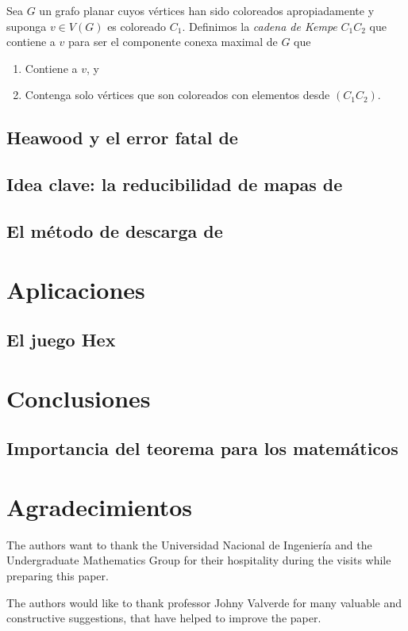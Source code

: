 \documentclass[3p,times,a4paper,twocolumn,authoryear]{elsarticle} %
\begin{document}
\begin{definition}
Sea $G$ un grafo planar cuyos vértices han sido coloreados apropiadamente y suponga $v\in V(G)$ es coloreado $C_1$. Definimos la \emph{cadena de Kempe} $C_1C_2$ que contiene a $v$ para ser el componente conexa maximal de $G$ que

\begin{enumerate}%
	\item Contiene a $v$, y
	\item Contenga solo vértices que son coloreados con elementos desde $(C_1C_2)$.
	\end{enumerate}
\end{definition}

\subsection{Heawood y el error fatal de \citeauthor{kempe}}

\subsection{Idea clave: la reducibilidad de mapas de \citeauthor{birkhoff}}

\subsection{El método de descarga de \citeauthor{appel}}

\section{Aplicaciones}

\subsection{El juego Hex}

\section{Conclusiones}

\subsection{Importancia del teorema para los matemáticos}

\section*{Agradecimientos}

The authors want to thank the Universidad Nacional de Ingeniería and the Undergraduate Mathematics Group for their hospitality during the visits while preparing this paper.

The authors would like to thank professor Johny Valverde for many valuable and constructive suggestions, that have helped to improve the paper.

\nocite{*}
\printbibliography[title={Referencias}]
\end{document}
